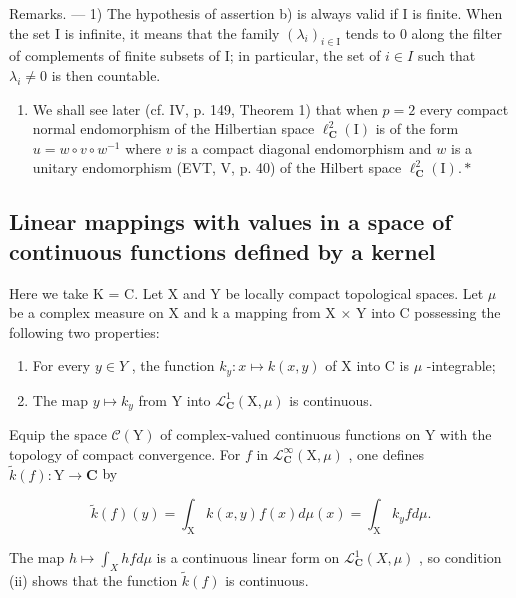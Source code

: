 Remarks. --- 1) The hypothesis of assertion b) is always valid if I is finite. When the set I is infinite, it means that the family \((\lambda_{i})_{i\in\mathrm{I}}\) tends to 0 along the filter of complements of finite subsets of I; in particular, the set of \(i\in I\) such that \(\lambda_{i}\neq0\) is then countable.

\begin{enumerate}
\def\labelenumi{\arabic{enumi})}
\setcounter{enumi}{1}
\tightlist
\item
  We shall see later (cf. IV, p. 149, Theorem 1) that when \(p = 2\) every compact normal endomorphism of the Hilbertian space \(\ell_{\mathbf{C}}^{2}(\mathrm{I})\) is of the form \(u = w \circ v \circ w^{-1}\) where \(v\) is a compact diagonal endomorphism and \(w\) is a unitary endomorphism (EVT, V, p. 40) of the Hilbert space \(\ell_{\mathbf{C}}^{2}(\mathrm{I}).*\)
\end{enumerate}

\subsection{Linear mappings with values in a space of continuous functions defined by a kernel}

Here we take K = C. Let X and Y be locally compact topological spaces. Let \(\mu\) be a complex measure on X and k a mapping from X × Y into C possessing the following two properties:

\begin{enumerate}
\def\labelenumi{(\roman{enumi})}
\item
  For every \(y \in Y\) , the function \(k_{y} \colon x \mapsto k(x, y)\) of X into C is \(\mu\) -integrable;
\item
  The map \(y \mapsto k_{y}\) from Y into \(\mathcal{L}_{\mathbf{C}}^{1}(\mathrm{X}, \mu)\) is continuous.
\end{enumerate}

Equip the space \(\mathcal{C}(\mathrm{Y})\) of complex-valued continuous functions on Y with the topology of compact convergence. For \(f\) in \(\mathcal{L}_{\mathbf{C}}^{\infty}(\mathrm{X},\mu)\) , one defines \(\widetilde{k}(f)\colon \mathrm{Y}\to \mathbf{C}\) by

\[
\widetilde {k} (f) (y) = \int_ {\mathrm{X}} k (x, y) f (x) d \mu (x) = \int_ {\mathrm{X}} k _ {y} f d \mu .\tag{1}
\]

The map \(h \mapsto \int_{X} hfd\mu\) is a continuous linear form on \(\mathcal{L}_{\mathbf{C}}^{1}(X,\mu)\) , so condition (ii) shows that the function \(\widetilde{k}(f)\) is continuous.

